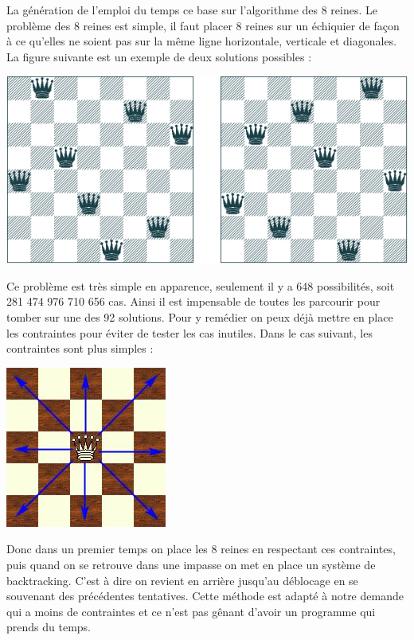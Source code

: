 \documentclass[12pt,a4paper]{article}
\begin{document}
\begin{large}
\begin{onehalfspace}La génération de l’emploi du temps ce base sur l’algorithme des 8 reines. Le problème des 8 reines est simple, il faut placer 8 reines sur un échiquier de façon à ce qu’elles ne soient pas sur la même ligne horizontale, verticale et diagonales. La figure suivante est un exemple de deux solutions possibles :

  \includegraphics[scale=0.5]{figure10(3_6).png}

	Ce problème est très simple en apparence, seulement il y a 648 possibilités, soit 281 474 976 710 656 cas. Ainsi il est impensable de toutes les parcourir pour tomber sur une des 92 solutions. Pour y remédier on peux déjà mettre en place les contraintes pour éviter de tester les cas inutiles. Dans le cas suivant, les contraintes sont plus simples :

    \includegraphics[scale=0.5]{figure11(3_7).jpg}

    Donc dans un premier temps on place les 8 reines en respectant ces contraintes, puis quand on se retrouve dans une impasse on met en place un système de backtracking. C’est à dire on revient en arrière jusqu’au déblocage en se souvenant des précédentes tentatives. Cette méthode est adapté à notre demande qui a moins de contraintes et ce n’est pas gênant d’avoir un programme qui prends du temps.


\end{onehalfspace}
\end{large}
\end{document}
